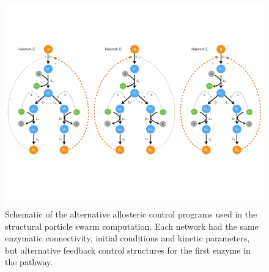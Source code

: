 \documentclass[processes,article,accept,moreauthors,pdftex,12pt,a4paper]{mdpi}
\begin{document}
\begin{figure}[H]
\centering
\includegraphics[width=1.0\textwidth]{./figs/Figure-6-AlternativeNetworks.pdf}
\caption{Schematic of the alternative allosteric control programs used in the structural particle swarm computation. 
Each network had the same enzymatic connectivity, initial conditions and kinetic parameters, 
but alternative feedback control structures for the first enzyme in the pathway.}\label{fig-alternative-networks}
\end{figure}
\end{document}
